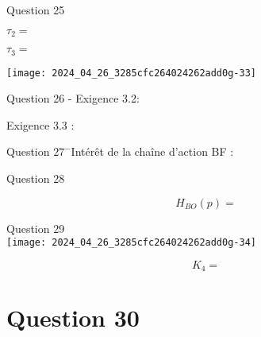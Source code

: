 Question 25

$\tau_{2}=$

$\tau_{3}=$

\begin{center}
\texttt{[image: 2024\_04\_26\_3285cfc264024262add0g-33]}
\end{center}

Question 26 - Exigence 3.2:

Exigence 3.3 :

Question $27^{-}$Intérêt de la chaîne d'action BF :

Question 28

$$
H_{B O}(p)=
$$

Question 29\\
\texttt{[image: 2024\_04\_26\_3285cfc264024262add0g-34]}

$$
K_{4}=
$$

\section*{Question 30}

